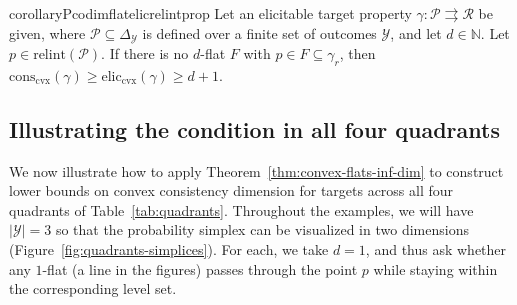 \documentclass{article} %
\newcommand{\simplex}{\Delta_\Y}
\newcommand{\relint}[1]{\mathrm{relint}(#1)}
\newcommand{\eliccvx}{\mathrm{elic}_\mathrm{cvx}}
\newcommand{\conscvx}{\mathrm{cons}_\mathrm{cvx}}
\newcommand{\Pcodimension}{$\mathcal{P}$-codimension\,}
\renewcommand{\L}{\mathcal{L}}
\newcommand{\Lcvx}{\mathcal{L}^{\mathrm{cvx}}}
\newcommand{\R}{\mathcal{R}}
\renewcommand{\P}{\mathcal{P}}
\newcommand{\Y}{\mathcal{Y}}
\newcommand{\toto}{\rightrightarrows}
\begin{document}
\begin{restatable}{corollary}{Pcodimflatelicrelintprop}\label{cor:Pcodim-flat-elic-relint-prop}
	Let an elicitable target property $\gamma:\P \toto \R$ be given, where $\P\subseteq\simplex$ is defined over a finite set of outcomes $\Y$, and let $d\in\mathbb N$.
	Let $p \in \relint{\P}$.
	If there is no $d$-flat $F$ with $p \in F \subseteq \gamma_r$, then $\conscvx(\gamma) \geq \eliccvx(\gamma) \geq d + 1$.%
\end{restatable}



\subsection{Illustrating the condition in all four quadrants}
\label{sec:illustration}
We now illustrate how to apply Theorem~\ref{thm:convex-flats-inf-dim} to construct lower bounds on convex consistency dimension for targets across all four quadrants of Table~\ref{tab:quadrants}.
Throughout the examples, we will have $|\Y|=3$ so that the probability simplex can be visualized in two dimensions (Figure~\ref{fig:quadrants-simplices}).
For each, we take $d=1$, and thus ask whether any $1$-flat (a line in the figures) passes through the point $p$ while staying within the corresponding level set.
\end{document}
